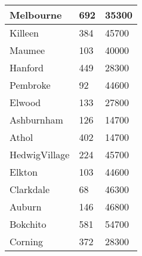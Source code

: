 \documentclass[titlepage]{article}
\begin{document}
\begin{table}[!ht]
\begin{tabular}{|l|l|l|}
        Melbourne & 692 & 35300 \\ \hline
        Killeen & 384 & 45700 \\ \hline
        Maumee & 103 & 40000 \\ \hline
        Hanford & 449 & 28300 \\ \hline
        Pembroke & 92 & 44600 \\ \hline
        Elwood & 133 & 27800 \\ \hline
        Ashburnham & 126 & 14700 \\ \hline
        Athol & 402 & 14700 \\ \hline
        HedwigVillage & 224 & 45700 \\ \hline
        Elkton & 103 & 44600 \\ \hline
        Clarkdale & 68 & 46300 \\ \hline
        Auburn & 146 & 46800 \\ \hline
        Bokchito & 581 & 54700 \\ \hline
        Corning & 372 & 28300 \\ \hline
    \end{tabular}
\end{table}
\end{document}
